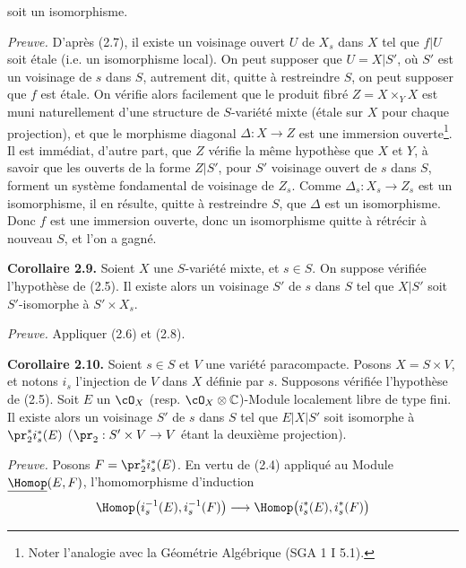 soit un isomorphisme.

\emph{Preuve.} D'après (2.7), il existe un voisinage ouvert $U$ de $X_s$ dans $X$ tel que $f|U$ soit étale (i.e. un isomorphisme local). On peut supposer que $U=X|S'$, où $S'$ est un voisinage de $s$ dans $S$, autrement dit, quitte à restreindre $S$, on peut supposer que $f$ est étale. On vérifie alors facilement que le produit fibré $Z=X\times_Y X$ est muni naturellement d'une structure de $S$-variété mixte (étale sur $X$ pour chaque projection), et que le morphisme diagonal $\Delta:X\to Z$ est une immersion ouverte\footnote{Noter l'analogie avec la Géométrie Algébrique (SGA 1 I 5.1).}. Il est immédiat, d'autre part, que $Z$ vérifie la même hypothèse que $X$ et $Y$, à savoir que les ouverts de la forme $Z|S'$, pour $S'$ voisinage ouvert de $s$ dans $S$, forment un système fondamental de voisinage de $Z_s$. Comme $\Delta_s:X_s\to Z_s$ est un isomorphisme, il en résulte, quitte à restreindre $S$, que $\Delta$ est un isomorphisme. Donc $f$ est une immersion ouverte, donc un isomorphisme quitte à rétrécir à nouveau $S$, et l'on a gagné.

\textbf{Corollaire 2.9.} Soient $X$ une $S$-variété mixte, et $s\in S$. On suppose vérifiée l'hypothèse de (2.5). Il existe alors un voisinage $S'$ de $s$ dans $S$ tel que $X|S'$ soit $S'$-isomorphe à $S'\times X_s$.

\emph{Preuve.} Appliquer (2.6) et (2.8).

\textbf{Corollaire 2.10.} Soient $s\in S$ et $V$ une variété paracompacte. Posons $X=S\times V$, et notons $i_s$ l'injection de $V$ dans $X$ définie par $s$. Supposons vérifiée l'hypothèse de (2.5). Soit $E$ un $\cO_X$ (resp. $\cO_X\otimes\mathbb C$)-Module localement libre de type fini. Il existe alors un voisinage $S'$ de $s$ dans $S$ tel que $E|X|S'$ soit isomorphe à $\pr_2^*i_s^*(E)$ ($\pr_2:S'\times V\to V$ étant la deuxième projection).

\emph{Preuve.} Posons $F=\pr_2^*i_s^*(E)$. En vertu de (2.4) appliqué au Module $\underline{\Homop}(E,F)$, l'homomorphisme d'induction
\[
  \Homop\bigl(i_s^{-1}(E),i_s^{-1}(F)\bigr)
  \longrightarrow
  \Homop\bigl(i_s^*(E),i_s^*(F)\bigr)
\]
